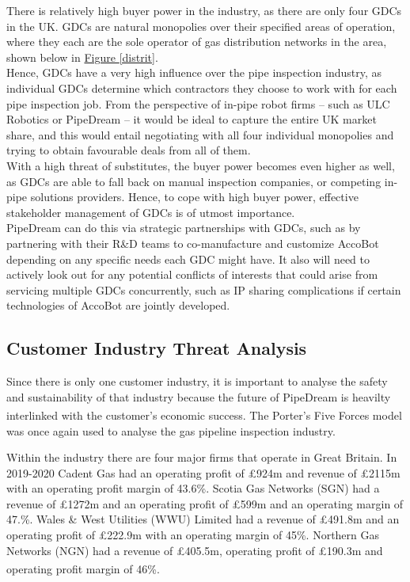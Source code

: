 \documentclass[11pt]{article}		%
\newcommand{\supercite}[1]{\textsuperscript{\cite{#1}}}		%
\newcommand{\figref}[1]{\hyperref[#1]{Figure \ref*{#1}}}    %
\begin{document}
    			There is relatively high buyer power in the industry, as there are only four GDCs in the UK. GDCs are natural monopolies over their specified areas of operation, where they each are the sole operator of gas distribution networks in the area, shown below in \figref{distrit}.
                \\\hspace*{3ex}Hence, GDCs have a very high influence over the pipe inspection industry, as individual GDCs determine which contractors they choose to work with for each pipe inspection job. From the perspective of in-pipe robot firms – such as ULC Robotics or PipeDream – it would be ideal to capture the entire UK market share, and this would entail negotiating with all four individual monopolies and trying to obtain favourable deals from all of them. 
                \\\hspace*{3ex}With a high threat of substitutes, the buyer power becomes even higher as well, as GDCs are able to fall back on manual inspection companies, or competing in-pipe solutions providers. Hence, to cope with high buyer power, effective stakeholder management of GDCs is of utmost importance.
                \\\hspace*{3ex}PipeDream can do this via strategic  partnerships with GDCs, such as by partnering with their R\&D teams to co-manufacture and customize AccoBot depending on any specific needs each GDC might have. It also will need to actively look out for any potential conflicts of interests that could arise from servicing multiple GDCs concurrently, such as IP sharing complications if certain technologies of AccoBot are jointly developed. 
				
	\subsection{Customer Industry Threat Analysis}

		Since there is only one customer industry, it is important to analyse the safety and sustainability of that industry because the future of PipeDream is heavilty interlinked with the customer's economic success.
		The Porter's Five Forces model\supercite{porter2008five} was once again used to analyse the gas pipeline inspection industry.
		
		Within the industry there are four major firms that operate in Great Britain. In 2019-2020 Cadent Gas had an operating profit of £924m and revenue of £2115m with an operating profit margin of 43.6\%. Scotia Gas Networks (SGN) had a revenue of £1272m and an operating profit of £599m and an operating margin of 47.\%. Wales \& West Utilities (WWU) Limited had a revenue of £491.8m and an operating profit of £222.9m with an operating margin of 45\%. Northern Gas Networks (NGN) had a revenue of £405.5m, operating profit of £190.3m and operating profit margin of 46\%.  \supercite{Gas_Distribution_Industry}
			
\end{document}
